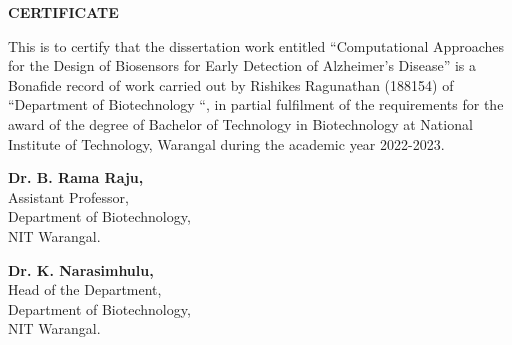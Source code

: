 \begin{center}
    \textbf{\LARGE CERTIFICATE}
\end{center}

\vspace{1in}

This is to certify that the dissertation work entitled “Computational Approaches for the Design of Biosensors for Early Detection of Alzheimer's Disease” is a Bonafide record of work carried out by 
Rishikes Ragunathan (188154) of “Department of Biotechnology “, 
in partial fulfilment of the requirements for the award of the degree of Bachelor of Technology in Biotechnology at National Institute of Technology, 
Warangal during the academic year 2022-2023.

\vspace{1in}


\begin{minipage}{2.2in}
    \textbf{Dr. B. Rama Raju,} \\
    Assistant Professor, \\
    Department of Biotechnology, \\
    NIT Warangal.
\end{minipage}
\hfill
\begin{minipage}{2.1in}
    \textbf{Dr. K. Narasimhulu,} \\
    Head of the Department, \\
    Department of Biotechnology, \\
    NIT Warangal.
\end{minipage}

\newpage
